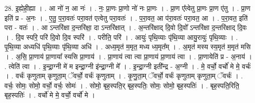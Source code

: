 \documentclass[17pt]{extarticle}
\begin{document}
28. इ॒ह्येही॒ह्या । . आ नो॑ न॒ आ नः॑ । . नः॒ प्रा॒णः प्रा॒णो नो॑ नः प्रा॒णः । . प्रा॒ण ए᳚त्वेतु प्रा॒णः प्रा॒ण ए॑तु । . प्रा॒ण इति॑ प्र - अ॒नः । . ए॒तु॒ प॒रा॒वतः॑ परा॒वत॑ एत्वेतु परा॒वतः॑ । . प॒रा॒वत॒ आ प॑रा॒वतः॑ परा॒वत॒ आ । . प॒रा॒वत॒ इति॑ परा - वतः॑ । . आ ऽन्तरि॑क्षा द॒न्तरि॑क्षा॒ दा ऽन्तरि॑क्षात् । . अ॒न्तरि॑क्षाद् दि॒वो दि॒वो᳚ ऽन्तरि॑क्षा द॒न्तरि॑क्षाद् दि॒वः । . दि॒व स्परि॒ परि॑ दि॒वो दि॒व स्परि॑ । . परीति॒ परि॑ । . आयुः॑ पृथि॒व्याः पृ॑थि॒व्या आयु॒रायुः॑ पृथि॒व्याः । . पृ॒थि॒व्या अध्यधि॑ पृथि॒व्याः पृ॑थि॒व्या अधि॑ । . अध्य॒मृत॑ म॒मृत॒ मध्य ध्य॒मृत᳚म् । . अ॒मृत॑ मस्य स्य॒मृत॑ म॒मृत॑ मसि । . अ॒सि॒ प्रा॒णाय॑ प्रा॒णाया᳚ स्यसि प्रा॒णाय॑ । . प्रा॒णाय॑ त्वा त्वा प्रा॒णाय॑ प्रा॒णाय॑ त्वा । . प्रा॒णायेति॑ प्र - अ॒नाय॑ । . त्वेति॑ त्वा । . इ॒न्द्रा॒ग्नी मे॑ म इन्द्रा॒ग्नी इ॑न्द्रा॒ग्नी मे᳚ । . इ॒न्द्रा॒ग्नी इती᳚न्द्र - अ॒ग्नी । . मे॒ वर्चो॒ वर्चो॑ मे मे॒ वर्चः॑ । . वर्चः॑ कृणुताम् कृणुता॒म् ॅवर्चो॒ वर्चः॑ कृणुताम् । . कृ॒णु॒ता॒म् ॅवर्चो॒ वर्चः॑ कृणुताम् कृणुता॒म् ॅवर्चः॑ । . वर्चः॒ सोमः॒ सोमो॒ वर्चो॒ वर्चः॒ सोमः॑ । . सोमो॒ बृह॒स्पति॒र् बृह॒स्पतिः॒ सोमः॒ सोमो॒ बृह॒स्पतिः॑ । . बृह॒स्पति॒रिति॒ बृह॒स्पतिः॑ । . वर्चो॑ मे मे॒ वर्चो॒ वर्चो॑ मे । \newline
\end{document}

